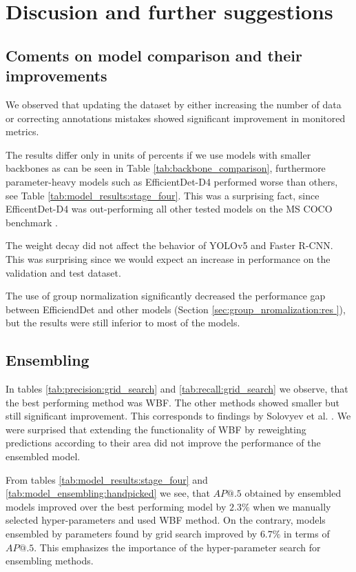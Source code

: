 \chapter{Discusion and further suggestions}
\label{chapter:discusion}

\section{Coments on model comparison and their improvements}
We observed that updating the dataset by either increasing the number of data or correcting annotations mistakes showed significant improvement in monitored metrics.

The results differ only in units of percents if we use models with smaller backbones as can be seen in Table \ref{tab:backbone_comparison}, furthermore parameter-heavy models such as EfficientDet-D4 performed worse than others, see Table \ref{tab:model_results:stage_four}. This was a surprising fact, since EfficentDet-D4 was out-performing all other tested models on the MS COCO benchmark \cite{paperwithcode,Tan2019}.


The weight decay did not affect the behavior of YOLOv5 and Faster R-CNN. This was surprising since we would expect an increase in performance on the validation and test dataset.

The use of group normalization significantly decreased the performance gap between EfficiendDet and other models (Section \ref{sec:group_nromalization:res }), but the results were still inferior to most of the models.


\section{Ensembling}
In tables \ref{tab:precision:grid_search} and \ref{tab:recall:grid_search} we observe, that the best performing method was WBF. The other methods showed smaller but still significant improvement. This corresponds to findings by Solovyev et al. \cite{Solovyev2019}. We were surprised that extending the functionality of WBF by reweighting predictions according to their area did not improve the performance of the ensembled model.

From tables \ref{tab:model_results:stage_four} and \ref{tab:model_ensembling:handpicked} we see, that $AP@.5$ obtained by ensembled models improved over the best performing model by $2.3\%$ when we manually selected hyper-parameters and used WBF method. On the contrary, models ensembled by parameters found by grid search improved by $6.7\%$ in terms of $AP@.5$. This emphasizes the importance of the hyper-parameter search for ensembling methods.

